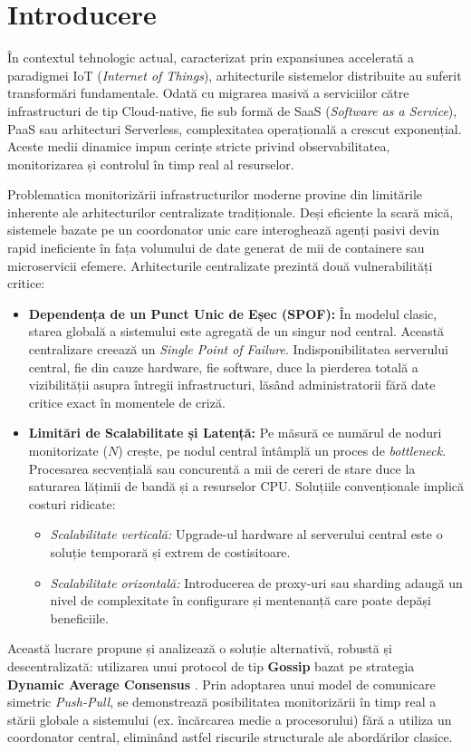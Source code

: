 \section{Introducere}
\label{sec:intro}

În contextul tehnologic actual, caracterizat prin expansiunea accelerată a paradigmei IoT (\textit{Internet of Things}), arhitecturile sistemelor distribuite au suferit transformări fundamentale. Odată cu migrarea masivă a serviciilor către infrastructuri de tip Cloud-native, fie sub formă de SaaS (\textit{Software as a Service}), PaaS sau arhitecturi Serverless, complexitatea operațională a crescut exponențial. Aceste medii dinamice impun cerințe stricte privind observabilitatea, monitorizarea și controlul în timp real al resurselor.

Problematica monitorizării infrastructurilor moderne provine din limitările inherente ale arhitecturilor centralizate tradiționale. Deși eficiente la scară mică, sistemele bazate pe un coordonator unic care interoghează agenți pasivi devin rapid ineficiente în fața volumului de date generat de mii de containere sau microservicii efemere. Arhitecturile centralizate prezintă două vulnerabilități critice:

\begin{itemize}
    \item \textbf{Dependența de un Punct Unic de Eșec (SPOF):} În modelul clasic, starea globală a sistemului este agregată de un singur nod central. Această centralizare creează un \textit{Single Point of Failure}. Indisponibilitatea serverului central, fie din cauze hardware, fie software, duce la pierderea totală a vizibilității asupra întregii infrastructuri, lăsând administratorii fără date critice exact în momentele de criză.
    
    \item \textbf{Limitări de Scalabilitate și Latență:} Pe măsură ce numărul de noduri monitorizate ($N$) crește, pe nodul central întâmplă un proces de \textit{bottleneck}. Procesarea secvențială sau concurentă a mii de cereri de stare duce la saturarea lățimii de bandă și a resurselor CPU. Soluțiile convenționale implică costuri ridicate:
    \begin{itemize}
        \item \textit{Scalabilitate verticală:} Upgrade-ul hardware al serverului central este o soluție temporară și extrem de costisitoare.
        \item \textit{Scalabilitate orizontală:} Introducerea de proxy-uri sau sharding adaugă un nivel de complexitate în configurare și mentenanță care poate depăși beneficiile.
    \end{itemize}
\end{itemize}

Această lucrare propune și analizează o soluție alternativă, robustă și descentralizată: utilizarea unui protocol de tip \textbf{Gossip} bazat pe strategia \textbf{Dynamic Average Consensus} \cite{spanos2005dynamic}. Prin adoptarea unui model de comunicare simetric \textit{Push-Pull}, se demonstrează posibilitatea monitorizării în timp real a stării globale a sistemului (ex. încărcarea medie a procesorului) fără a utiliza un coordonator central, eliminând astfel riscurile structurale ale abordărilor clasice.